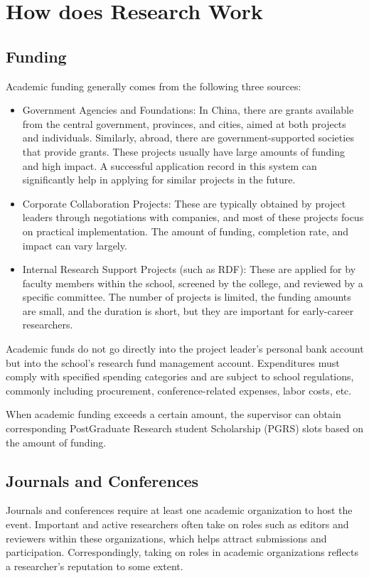 \section{How does Research Work}
\label{section.how-research-works}

\subsection{Funding}
Academic funding generally comes from the following three sources:
\begin{itemize}
    \item Government Agencies and Foundations: In China, there are grants available from the central government, provinces, and cities, aimed at both projects and individuals. Similarly, abroad, there are government-supported societies that provide grants. These projects usually have large amounts of funding and high impact. A successful application record in this system can significantly help in applying for similar projects in the future.
    \item Corporate Collaboration Projects: These are typically obtained by project leaders through negotiations with companies, and most of these projects focus on practical implementation. The amount of funding, completion rate, and impact can vary largely.
    \item Internal Research Support Projects (such as RDF): These are applied for by faculty members within the school, screened by the college, and reviewed by a specific committee. The number of projects is limited, the funding amounts are small, and the duration is short, but they are important for early-career researchers.
\end{itemize}

Academic funds do not go directly into the project leader’s personal bank account but into the school’s research fund management account. Expenditures must comply with specified spending categories and are subject to school regulations, commonly including procurement, conference-related expenses, labor costs, etc.

When academic funding exceeds a certain amount, the supervisor can obtain corresponding PostGraduate Research student Scholarship (PGRS) slots based on the amount of funding.


\subsection{Journals and Conferences}
Journals and conferences require at least one academic organization to host the event. Important and active researchers often take on roles such as editors and reviewers within these organizations, which helps attract submissions and participation. Correspondingly, taking on roles in academic organizations reflects a researcher’s reputation to some extent.

